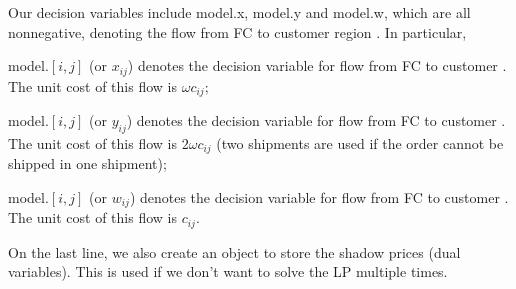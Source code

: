 \documentclass[letterpaper,10pt,english]{jupyterBook}
\begin{document}
\sphinxAtStartPar
Our decision variables include model.x, model.y and model.w, which are all nonnegative, denoting the flow from FC  to customer region . In particular,

\sphinxAtStartPar
model.\([i, j]\) (or \(x_{ij}\)) denotes the decision variable for  flow from FC  to  customer . The unit cost of this flow is \(\omega c_{ij}\);

\sphinxAtStartPar
model.\([i, j]\) (or \(y_{ij}\)) denotes the decision variable for  flow from FC  to  customer . The unit cost of this flow is \(2\omega c_{ij}\) (two shipments are used if the order cannot be shipped in one shipment);

\sphinxAtStartPar
model.\([i, j]\) (or \(w_{ij}\)) denotes the decision variable for flow from FC  to  customer .  The unit cost of this flow is \(c_{ij}\).

\sphinxAtStartPar
On the last line, we also create an object to store the shadow prices (dual variables). This is used if we don’t want to solve the LP multiple times.
\end{document}
